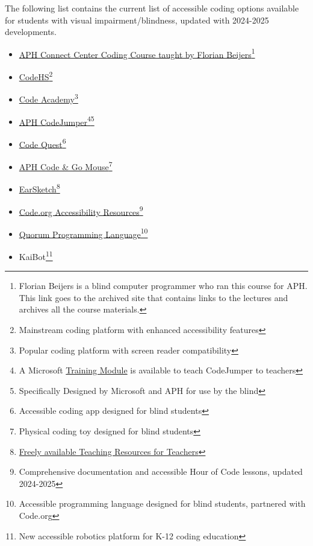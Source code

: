 \begin{itemize}
\begin{itemize}
The following list contains the current list of accessible coding options available for students with visual impairment/blindness, updated with 2024-2025 developments.
\begin{itemize}
 \begin{itemize}
  \item \href{https://zersiax.github.io/}{APH Connect Center Coding Course taught by Florian Beijers}\footnote{\raggedright Florian Beijers is a blind computer programmer who ran this course for APH. This link goes to the archived site that contains links to the lectures and archives all the course materials.}
  \item \href{https://codehs.com/}{CodeHS}\footnote{\raggedright Mainstream coding platform with enhanced accessibility features}
  \item \href{https://www.codecademy.com/}{Code Academy}\footnote{\raggedright Popular coding platform with screen reader compatibility}
  \item \href{https://codejumper.com/}{APH CodeJumper}\footnote{\raggedright A Microsoft \href{https://docs.microsoft.com/en-us/learn/modules/code-jumper-inclusive-physical-coding-language/}{Training Module} is available to teach CodeJumper to teachers}\footnote{\raggedright Specifically Designed by Microsoft and APH for use by the blind}
  \item \href{https://www.aph.org/product/code-quest-for-ipad-iphone/}{Code Quest}\footnote{\raggedright Accessible coding app designed for blind students}
  \item \href{https://www.aph.org/product/accessible-code-and-go-mouse/}{APH Code \& Go Mouse}\footnote{\raggedright Physical coding toy designed for blind students}
  \item \href{https://earsketch.gatech.edu/landing/}{EarSketch}\footnote{\raggedright \href{https://www.teachers.earsketch.org/learn}{Freely available Teaching Resources for Teachers}}
  \item \href{https://code.org/accessibility}{Code.org Accessibility Resources}\footnote{\raggedright Comprehensive documentation and accessible Hour of Code lessons, updated 2024-2025}
  \item \href{https://quorumlanguage.com/}{Quorum Programming Language}\footnote{\raggedright Accessible programming language designed for blind students, partnered with Code.org}
  \item KaiBot\footnote{\raggedright New accessible robotics platform for K-12 coding education}
 \end{itemize}


\end{itemize}
\end{itemize}
\end{itemize}
